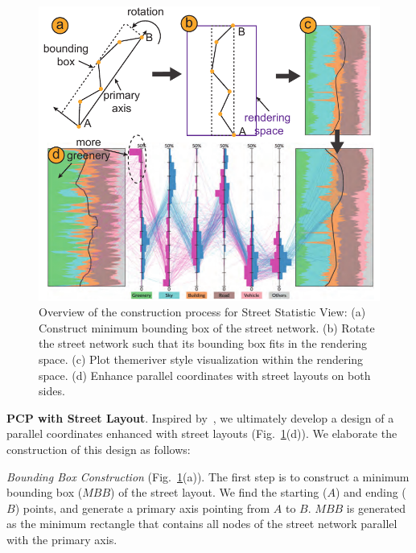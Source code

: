 \begin{figure}[t]
	\centering
	\includegraphics[width=0.9\columnwidth]{figure/streetvizor/fig7_street_model/street_pcp}
	\vspace{-5mm}
	\caption{Overview of the construction process for Street Statistic View:
	(a) Construct minimum bounding box of the street network.
	(b) Rotate the street network such that its bounding box fits in the rendering space.
	(c) Plot themeriver style visualization within the rendering space.
	(d) Enhance parallel coordinates with street layouts on both sides.}
	\label{fig:c1_street_statistic_view}
	\vspace{-1mm}
\end{figure}

\vspace*{2mm}
\noindent
\textbf{PCP with Street Layout}. Inspired by~\cite{qu2007visual}, we ultimately develop a design of a parallel coordinates enhanced with street layouts (Fig.~\ref{fig:c1_street_statistic_view}(d)).
We elaborate the construction of this design as follows:

\noindent
\textit{Bounding Box Construction} (Fig.~\ref{fig:c1_street_statistic_view}(a)).
The first step is to construct a minimum bounding box ($MBB$) of the street layout.
We find the starting ($A$) and ending ($B$) points, and generate a primary axis pointing from $A$ to $B$.
$MBB$ is generated as the minimum rectangle that contains all nodes of the street network parallel with the primary axis.

